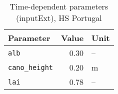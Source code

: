 \begin{table}[ht]
\centering
\caption{Time-dependent parameters (\textsf{inputExt}), HS Portugal} 
\label{tab:portugalHS_inputExt}
\begin{tabular}{lrl}
  \hline
Parameter & Value & Unit \\ 
  \hline
\verb!alb! & 0.30 & -- \\ 
  \verb!cano_height! & 0.20 & m \\ 
  \verb!lai! & 0.78 & -- \\ 
   \hline
\end{tabular}
\end{table}
